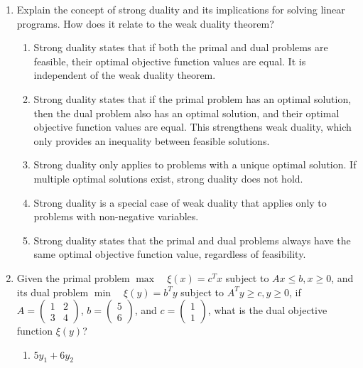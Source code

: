 \documentclass{article}%
\begin{document}
\begin{enumerate}
\begin{enumerate}
\item Weak duality is irrelevant to the feasibility and boundedness of the primal and dual problems; it only concerns the relationship between the objective function coefficients.%
\end{enumerate}%
\vspace{1em}%
\item Explain the concept of strong duality and its implications for solving linear programs.  How does it relate to the weak duality theorem?%
\begin{enumerate}%
\item Strong duality states that if both the primal and dual problems are feasible, their optimal objective function values are equal.  It is independent of the weak duality theorem.%
\item Strong duality states that if the primal problem has an optimal solution, then the dual problem also has an optimal solution, and their optimal objective function values are equal. This strengthens weak duality, which only provides an inequality between feasible solutions.%
\item Strong duality only applies to problems with a unique optimal solution. If multiple optimal solutions exist, strong duality does not hold.%
\item Strong duality is a special case of weak duality that applies only to problems with non-negative variables.%
\item Strong duality states that the primal and dual problems always have the same optimal objective function value, regardless of feasibility.%
\end{enumerate}%
\vspace{1em}%
\item Given the primal problem $\max \quad \xi(x) = c^T x$ subject to $Ax \leq b, x \geq 0$, and its dual problem $\min \quad \xi(y) = b^T y$ subject to $A^T y \geq c, y \geq 0$,  if $A = \begin{pmatrix} 1 & 2 \\ 3 & 4 \end{pmatrix}$, $b = \begin{pmatrix} 5 \\ 6 \end{pmatrix}$, and $c = \begin{pmatrix} 1 \\ 1 \end{pmatrix}$, what is the dual objective function $\xi(y)$?%
\begin{enumerate}%
\item $5y_1 + 6y_2$%

\end{enumerate}
\end{enumerate}
\end{document}

